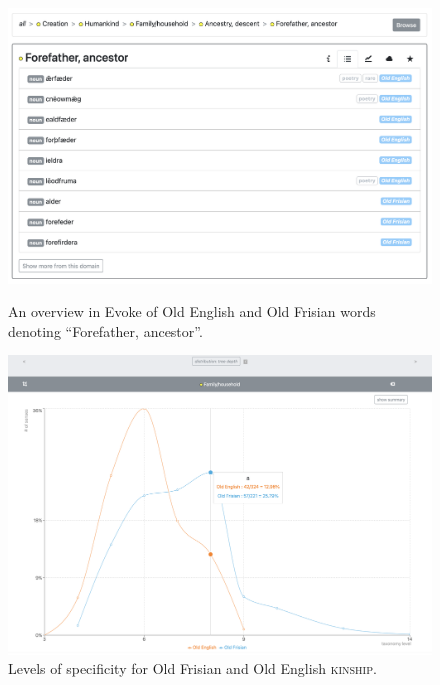 \begin{figure}[h]
\centering
\begin{minipage}{.48\textwidth}
  \includegraphics[width=\textwidth]{Stolk2021x/fig/VanDePoel-forefather.png}
	\caption[]{\label{fig:Stolk2021x:VanDePoel-fig1}An overview in Evoke of Old English and Old Frisian words denoting ``Forefather, ancestor''.}
\end{minipage}
\begin{minipage}{.04\textwidth}\end{minipage}
\begin{minipage}{.48\textwidth}
  \includegraphics[width=\textwidth]{Stolk2021x/fig/VanDePoel-specificity.png}
	\caption[]{\label{fig:Stolk2021x:VanDePoel-fig2}Levels of specificity for Old Frisian and Old English \textsc{kinship}.}
\end{minipage}
\end{figure}

